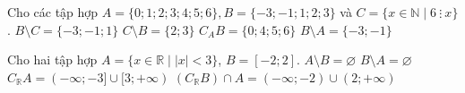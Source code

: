 \begin{ex}%
	Cho các tập hợp $A=\{0; 1; 2; 3; 4; 5; 6\}, B=\{-3;-1; 1;  2; 3\}$ và $C=\{x \in \mathbb{N} \mid 6~\vdots~ x\}$.
	\choiceTF 
		{$B\setminus C=\{-3;-1; 1\}$} 
		{$C\setminus  B=\{2; 3\}$}
		{\True  $C_A B=\{0; 4; 5; 6\}$}
		{\True $B\setminus A=\{-3;-1\}$} 
\end{ex}

\begin{ex}%
	Cho  hai tập hợp $A=\{x \in \mathbb{R}\mid |x|< 3\}$, $B=[-2; 2]$.
	 \choiceTF
		 {$A\setminus B=\varnothing$}
		{\True  $B\setminus A=\varnothing$}
		{\True $C_{\mathbb{R}} A=(-\infty;-3] \cup[3;+\infty)$} 
		 {$\left(C_{\mathbb{R}} B\right) \cap A=(-\infty;-2) \cup(2;+\infty)$}
	\loigiai{ 
		Ta có $|x|< 3\Leftrightarrow -3<x<3$  suy ra $A=(-3; 3)$.
		\begin{itemchoice}
			 \itemch $A\setminus B=(-3;-2) \cup(2; 3)$.
			\itemch $B\setminus  A=\varnothing$.
			\itemch $C_{\mathbb{R}} A=(-\infty;-3] \cup[3;+\infty)$. 
			 \itemch $\left(C_{\mathbb{R}} B\right) \cap A=(-3;-2) \cup(2; 3)$.
		\end{itemchoice}
	 }
\end{ex}

